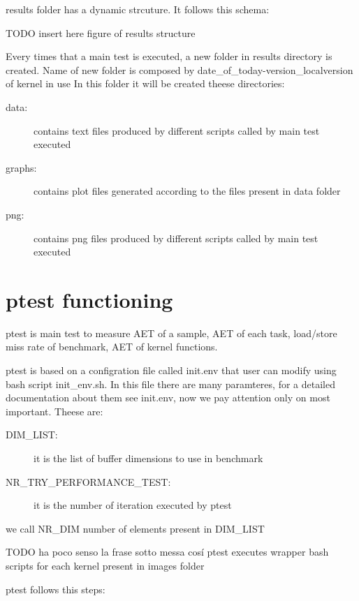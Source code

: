 \documentclass[a4paper,10pt]{article}
\begin{document}
\begin{multicols}{2}
results folder has a dynamic strcuture. It follows this schema:

TODO insert here figure of results structure

Every times that a main test is executed, a new folder in results directory is created.
Name of new folder is composed by date\_of\_today-version\_localversion of kernel in use
In this folder it will be created theese directories:

\begin{description}
	\item[data:] contains text files produced by different scripts called by main test executed
	\item[graphs:] contains plot files generated according to the files present in data folder
	\item[png:] contains png files produced by different scripts called by main test executed
\end{description}


\section{ptest functioning}

ptest is main test to measure AET of a sample, AET of each task, load/store 
miss rate of benchmark, AET of kernel functions.

ptest is based on a configration file called init.env that user can modify using 
bash script init\_env.sh. In this file there are many paramteres, for a detailed
documentation about them see init.env, now we pay attention only on most important.
Theese are:

\begin{description}
	\item[DIM\_LIST:] it is the list of buffer dimensions to use in benchmark
	\item[NR\_TRY\_PERFORMANCE\_TEST:] it is the number of iteration executed by ptest
\end{description}

we call NR\_DIM number of elements present in DIM\_LIST

TODO ha poco senso la frase sotto messa cos\'i
ptest executes wrapper bash scripts for each kernel present in images folder

ptest follows this steps:


\end{multicols}
\end{document}
